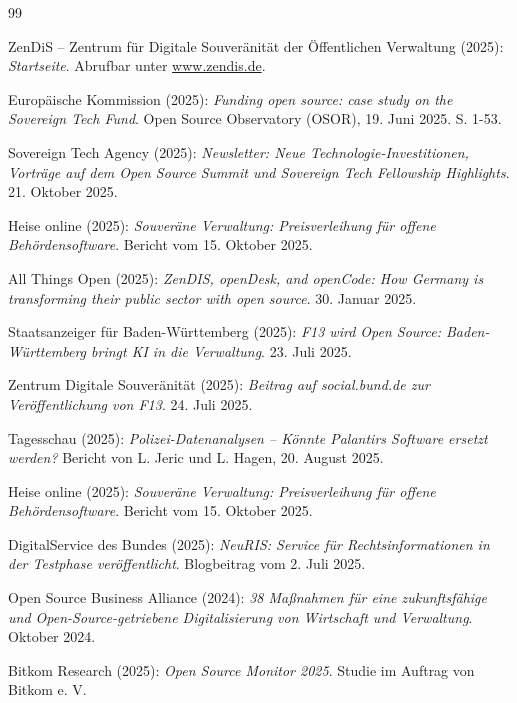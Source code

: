 \documentclass[12pt,a4paper]{article}
\begin{document}
	\newpage
	\begin{thebibliography}{99}
		
		
		 ZenDiS – Zentrum für Digitale Souveränität der Öffentlichen Verwaltung (2025): \emph{Startseite}. Abrufbar unter \url{www.zendis.de}.
		
		 Europäische Kommission (2025): \emph{Funding open source: case study on the Sovereign Tech Fund}. Open Source Observatory (OSOR), 19. Juni 2025. S. 1-53.
		
		 Sovereign Tech Agency (2025): \emph{Newsletter: Neue Technologie-Investitionen, Vorträge auf dem Open Source Summit und Sovereign Tech Fellowship Highlights}. 21. Oktober 2025.
		
		 Heise online (2025): \emph{Souveräne Verwaltung: Preisverleihung für offene Behördensoftware}. Bericht vom 15. Oktober 2025.
		
		 All Things Open (2025): \emph{ZenDIS, openDesk, and openCode: How Germany is transforming their public sector with open source}. 30. Januar 2025.
		
		 Staatsanzeiger für Baden-Württemberg (2025): \emph{F13 wird Open Source: Baden-Württemberg bringt KI in die Verwaltung}. 23. Juli 2025.
		
		 Zentrum Digitale Souveränität (2025): \emph{Beitrag auf social.bund.de zur Veröffentlichung von F13}. 24. Juli 2025.
		
		 Tagesschau (2025): \emph{Polizei-Datenanalysen – Könnte Palantirs Software ersetzt werden?} Bericht von L. Jeric und L. Hagen, 20. August 2025.
		
		 Heise online (2025): \emph{Souveräne Verwaltung: Preisverleihung für offene Behördensoftware}. Bericht vom 15. Oktober 2025.
		
		 DigitalService des Bundes (2025): \emph{NeuRIS: Service für Rechtsinformationen in der Testphase veröffentlicht}. Blogbeitrag vom 2. Juli 2025.
		
		 Open Source Business Alliance (2024): \emph{38 Maßnahmen für eine zukunftsfähige und Open-Source-getriebene Digitalisierung von Wirtschaft und Verwaltung}. Oktober 2024.
		
		 Bitkom Research (2025): \emph{Open Source Monitor 2025}. Studie im Auftrag von Bitkom e. V.
		
		
	\end{thebibliography}
	
\end{document}
